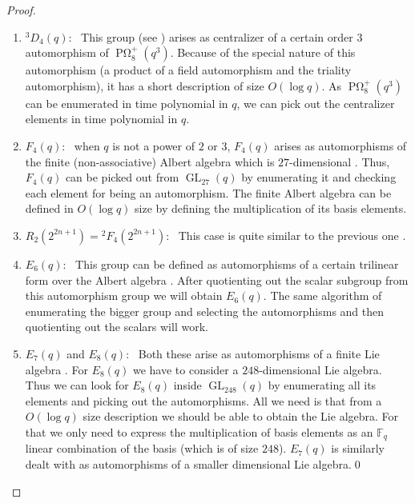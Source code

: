 \documentclass{elsarticle}
\newcommand{\Span}{\mathop{\mathrm{Span}}}
\newcommand{\GL}{\mathop{\mathrm{GL}}\nolimits}
\newcommand{\POm}{\mathop{\mathrm{P}\Omega}\nolimits}
\newcommand{\F}{\mathbb{F}}
\begin{document}
\begin{proof}
\begin{enumerate}
     analogously to $G_2(q)$ \cite[Section 4.5]{Wilson-book}.
    \item ${}^3{D}_4(q)$:~ This group (see \cite[Chapter
      4.6]{Wilson-book}) arises as centralizer of a certain order $3$
      automorphism of $\POm^+_8(q^3)$. Because of the special nature
      of this automorphism (a product of a field automorphism and the
      triality automorphism), it has a short description of size
      $O(\log q)$. As $\POm^+_8(q^3)$ can be enumerated in time
      polynomial in $q$, we can pick out the centralizer elements in
      time polynomial in $q$.
    \item $F_4(q)$:~ when $q$ is not a power of $2$ or $3$, $F_4(q)$
      arises as automorphisms of the finite (non-associative) Albert
      algebra which is $27$-dimensional \cite[Chapter
        4.8]{Wilson-book}. Thus, $F_4(q)$ can be picked out from
      $\GL_{27}(q)$ by enumerating it and checking each element for
      being an automorphism. The finite Albert algebra can be defined
      in $O(\log q)$ size by defining the multiplication of its basis
      elements.
    \item $R_2(2^{2n+1})={}^2F_4(2^{2n+1})$:~ This case is quite similar to
      the previous one \cite[Section 4.9]{Wilson-book}.
    \item $E_6(q)$:~ This group can be defined as automorphisms of a
      certain trilinear form over the Albert algebra \cite[Chapter
        4.10]{Wilson-book}. After quotienting out the scalar subgroup
      from this automorphism group we will obtain $E_6(q)$. The same
      algorithm of enumerating the bigger group and selecting the
      automorphisms and then quotienting out the scalars will work.
    \item $E_7(q)$ and $E_8(q)$:~ Both these arise as automorphisms of
      a finite Lie algebra \cite[Chapter 4.1  non-zero vector $\bar{u}\in\Span(\bar{x}_1,\bar{y}_1)$.
2]{Wilson-book}. For
      $E_8(q)$ we have to consider a $248$-dimensional Lie
      algebra. Thus we can look for $E_8(q)$ inside $\GL_{248}(q)$ by
      enumerating all its elements and picking out the
      automorphisms. All we need is that from a $O(\log q)$ size
      description we should be able to obtain the Lie algebra. For
      that we only need to express the multiplication of basis
      elements as an $\F_q$ linear combination of the basis (which is
      of size $248$). $E_7(q)$ is similarly dealt with as
      automorphisms of a smaller dimensional Lie algebra.\qed
    \end{enumerate}

  \end{proof}
\end{document}
